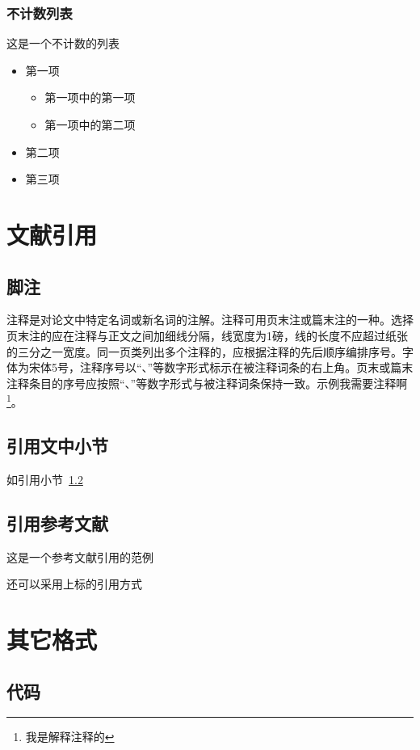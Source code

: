 \documentclass[]{WHUBachelor}
\begin{document}
  \subsection{不计数列表}
	这是一个不计数的列表
	\begin{itemize}
		\item 第一项
		\begin{itemize}
			\item 第一项中的第一项
			\item 第一项中的第二项
		\end{itemize}
		\item 第二项
		\item 第三项
	\end{itemize}

  \chapter{文献引用}

  \section{脚注}
  注释是对论文中特定名词或新名词的注解。注释可用页末注或篇末注的一种。选择页末注的应在注释与正文之间加细线分隔，线宽度为1磅，线的长度不应超过纸张的三分之一宽度。同一页类列出多个注释的，应根据注释的先后顺序编排序号。字体为宋体5号，注释序号以“、”等数字形式标示在被注释词条的右上角。页末或篇末注释条目的序号应按照“、”等数字形式与被注释词条保持一致。示例我需要注释啊\footnote{我是解释注释的}。

  \section{引用文中小节}\label{sec:ref}
  如引用小节~\ref{sec:ref}

  \section{引用参考文献}
  这是一个参考文献引用的范例\cite{kuhn2004man}

  还可以采用上标的引用方式

  \chapter{其它格式}
  \section{代码}
\end{document}
